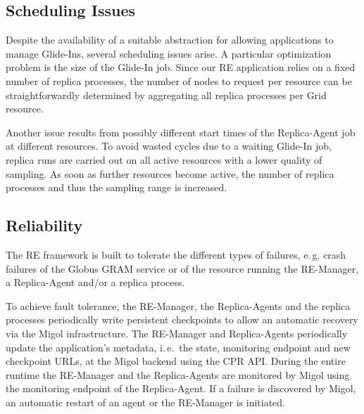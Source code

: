 \documentclass{rspublic}
\newcommand{\jhanote}[1]{ {\textcolor{red} { ***SJ: #1 }}}
\newcommand{\jhanote}[1]{}
\newcommand{\glidein}[1]{Glide-In }
\newcommand{\replicaagent}[1]{Replica-Agent }
\newcommand{\remanager}[1]{RE-Manager }
\begin{document}
\subsection{Scheduling Issues}

Despite the availability of a suitable abstraction for allowing applications to manage Glide-Ins, several scheduling issues
arise. A particular optimization problem is the size of the \glidein\ job. Since our 
RE application relies on a fixed number of replica processes, the number of nodes to request per resource can
be straightforwardly determined by aggregating all replica processes per Grid resource.

Another issue results from possibly different start times of the \replicaagent\ job at different resources.
To avoid wasted cycles due to a waiting \glidein\ job, replica runs are carried out on all active resources
with a lower quality of sampling. As soon as further resources become active, the number of replica processes
and thus the sampling range is increased.



                         

\subsection{Reliability}
   
The RE framework is built to tolerate the different types of failures, e.\,g.\:
crash failures of the Globus GRAM service or of the resource
running the RE-Manager, a Replica-Agent and/or a replica process.   
        
To achieve fault tolerance, the RE-Manager, the Replica-Agents and the replica processes
periodically write persistent checkpoints to allow an automatic recovery via the 
Migol infrastructure. The \remanager\ and Replica-Agents periodically update 
the application's metadata, i.\,e.\ the state, monitoring endpoint and new checkpoint
URLs, at the Migol backend using the CPR API. During the entire runtime the  \remanager\ and the 
Replica-Agents are monitored by Migol using the monitoring endpoint of the
Replica-Agent. If a failure is discovered by Migol, an automatic restart
of an agent or the RE-Manager is initiated.
                         
                           
\end{document}
